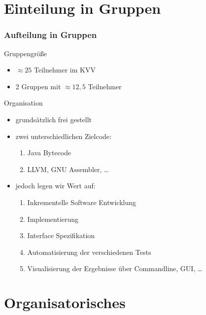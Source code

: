 \documentclass[ucs,9pt]{beamer}
\begin{document}
\section{Einteilung in Gruppen}
\begin{frame}
    \frametitle{Aufteilung in Gruppen}
    \begin{block}{Gruppengröße}
        \begin{itemize}
            \item $\approx 25$ Teilnehmer im KVV
            \item 2 Gruppen mit $\approx 12,5$ Teilnehmer
        \end{itemize}
    \end{block}
    \begin{block}{Organisation}
        \begin{itemize}
            \item grundsätzlich frei gestellt
            \item zwei unterschiedlichen Zielcode:
                \begin{enumerate}
                    \item Java Bytecode
                    \item LLVM, GNU Assembler, \dots
                \end{enumerate}
            \item jedoch legen wir Wert auf:
                \begin{enumerate}
                    \item Inkrementelle Software Entwicklung
                    \item Implementierung
                    \item Interface Spezifikation
                    \item Automatisierung der verschiedenen Tests
                    \item Visualisierung der Ergebnisse über Commandline, GUI,
                        \dots
                \end{enumerate}
        \end{itemize}
    \end{block}
\end{frame}

\section{Organisatorisches}
\end{document}
